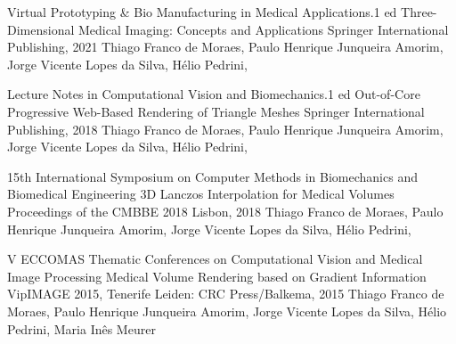 \begin{cventries}
  \cventry
  {Virtual Prototyping \& Bio Manufacturing in Medical Applications.1 ed}
  {Three-Dimensional Medical Imaging: Concepts and Applications}
  {Springer International Publishing, 2021}
  {}
  {
    Thiago Franco de Moraes,
    Paulo Henrique Junqueira Amorim,
    Jorge Vicente Lopes da Silva,
    Hélio Pedrini,
  }

  \cventry
  {Lecture Notes in Computational Vision and Biomechanics.1 ed}
  {Out-of-Core Progressive Web-Based Rendering of Triangle Meshes}
  {Springer International Publishing, 2018}
  {}
  {
    Thiago Franco de Moraes,
    Paulo Henrique Junqueira Amorim,
    Jorge Vicente Lopes da Silva,
    Hélio Pedrini,
  }

  \cventry
  {15th International Symposium on Computer Methods in Biomechanics and Biomedical Engineering}
  {3D Lanczos Interpolation for Medical Volumes}
  {Proceedings of the CMBBE 2018}
  {Lisbon, 2018}
  {
    Thiago Franco de Moraes,
    Paulo Henrique Junqueira Amorim,
    Jorge Vicente Lopes da Silva,
    Hélio Pedrini,
  }

  \cventry
    {V ECCOMAS Thematic Conferences on Computational Vision and Medical Image Processing}
    {Medical Volume Rendering based on Gradient Information}
    {VipIMAGE 2015, Tenerife}
    {Leiden: CRC Press/Balkema, 2015}
    {
    Thiago Franco de Moraes,
    Paulo Henrique Junqueira Amorim,
    Jorge Vicente Lopes da Silva,
    Hélio Pedrini,
    Maria Inês Meurer
    }









\end{cventries}

